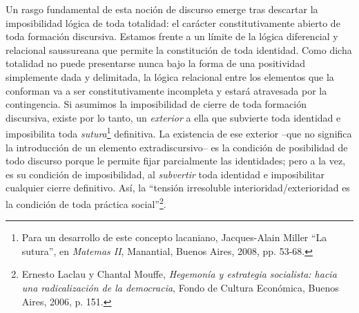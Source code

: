 Un rasgo fundamental de esta noción de discurso emerge tras descartar la
imposibilidad lógica de toda totalidad: el carácter constitutivamente
abierto de toda formación discursiva. Estamos frente a un límite de la
lógica diferencial y relacional saussureana que permite la constitución
de toda identidad. Como dicha totalidad no puede presentarse nunca bajo
la forma de una positividad simplemente dada y delimitada, la lógica
relacional entre los elementos que la conforman va a ser
constitutivamente incompleta y estará atravesada por la contingencia. Si
asumimos la imposibilidad de cierre de toda formación discursiva, existe
por lo tanto, un \emph{exterior} a ella que subvierte toda identidad e
imposibilita toda \emph{sutura}\footnote{Para un desarrollo de este
  concepto lacaniano, Jacques-Alain Miller \enquote{La sutura}, en \emph{Matemas
  II}, Manantial, Buenos Aires, 2008, pp. 53-68.} definitiva. La
existencia de ese exterior --que no significa la introducción de un
elemento extradiscursivo-- es la condición de posibilidad de todo
discurso porque le permite fijar parcialmente las identidades; pero a la
vez, es su condición de imposibilidad, al \emph{subvertir} toda
identidad e imposibilitar cualquier cierre definitivo. Así, la \enquote{tensión
irresoluble interioridad/exterioridad es la condición de toda práctica
social}\footnote{Ernesto Laclau y Chantal Mouffe, \emph{Hegemonía y
  estrategia socialista: hacia una radicalización de la democracia},
  Fondo de Cultura Económica, Buenos Aires, 2006, p. 151.}.

